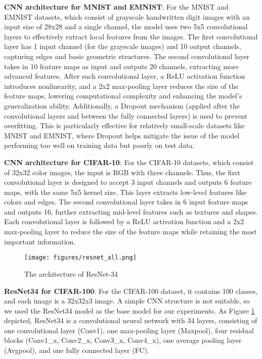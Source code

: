 \documentclass[a4paper,twoside,11pt,dvipsnames]{reviewresponse}
\begin{document}
\textbf{CNN architecture for MNIST and EMNIST}: For the MNIST and EMNIST datasets, which consist of grayscale handwritten digit images with an input size of 28x28 and a single channel, the model uses two 5x5 convolutional layers to effectively extract local features from the images. The first convolutional layer has 1 input channel (for the grayscale images) and 10 output channels, capturing edges and basic geometric structures. The second convolutional layer takes in 10 feature maps as input and outputs 20 channels, extracting more advanced features. After each convolutional layer, a ReLU activation function introduces nonlinearity, and a 2x2 max-pooling layer reduces the size of the feature maps, lowering computational complexity and enhancing the model’s generalization ability. Additionally, a Dropout mechanism (applied after the convolutional layers and between the fully connected layers) is used to prevent overfitting. This is particularly effective for relatively small-scale datasets like MNIST and EMNIST, where Dropout helps mitigate the issue of the model performing too well on training data but poorly on test data.

\textbf{CNN architecture for CIFAR-10}: For the CIFAR-10 datasets, which consist of 32x32 color images, the input is RGB with three channels. Thus, the first convolutional layer is designed to accept 3 input channels and outputs 6 feature maps, with the same 5x5 kernel size. This layer extracts low-level features like colors and edges. The second convolutional layer takes in 6 input feature maps and outputs 16, further extracting mid-level features such as textures and shapes. Each convolutional layer is followed by a ReLU activation function and a 2x2 max-pooling layer to reduce the size of the feature maps while retaining the most important information.

\begin{figure}[tb]
    \centering
    \texttt{[image: figures/resnet\_all.png]}
    \caption{The architecture of ResNet-34}
    \label{fig:resnet34}
\end{figure}

\textbf{ResNet34 for CIFAR-100}: For the CIFAR-100 dataset, it contains 100 classes, and each image is a 32x32x3 image. A simple CNN structure is not suitable, so we used the ResNet34 model as the base model for our experiments. As Figure \ref{fig:resnet34} depicted, ResNet34 is a convolutional neural network with 34 layers, consisting of one convolutional layer (Conv1), one max-pooling layer (Maxpool), four residual blocks (Conv1\_x, Conv2\_x, Conv3\_x, Conv4\_x), one average pooling layer (Avgpool), and one fully connected layer (FC).
\end{document}
